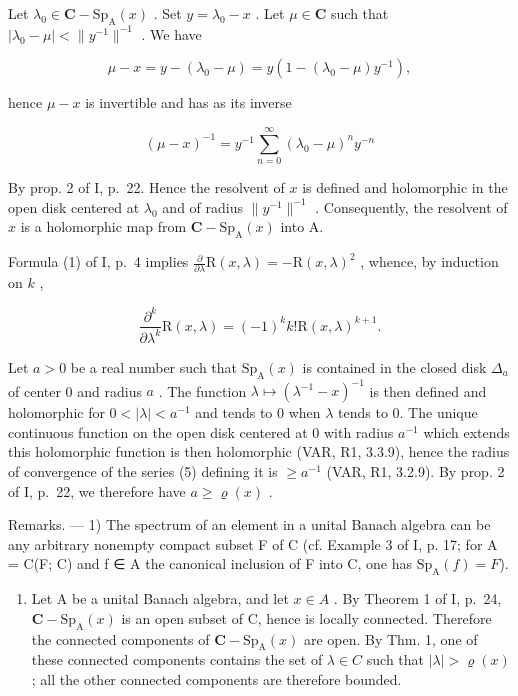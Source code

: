 Let \(\lambda_0\in \mathbf{C} - \mathrm{Sp}_{\mathrm{A}}(x)\) . Set \(y = \lambda_0 - x\) . Let \(\mu \in \mathbf{C}\) such that \(|\lambda_0 - \mu | < \| y^{-1}\|^{-1}\) . We have

\[
\mu - x = y - (\lambda_ {0} - \mu) = y (1 - (\lambda_ {0} - \mu) y ^ {- 1}),
\]

hence \(\mu - x\) is invertible and has as its inverse

\[
(\mu - x) ^ {- 1} = y ^ {- 1} \sum_ {n = 0} ^ {\infty} (\lambda_ {0} - \mu) ^ {n} y ^ {- n}\tag{6}
\]

By prop. 2 of I, p.~22. Hence the resolvent of \(x\) is defined and holomorphic in the open disk centered at \(\lambda_0\) and of radius \(\| y^{-1} \|^{-1}\) . Consequently, the resolvent of \(x\) is a holomorphic map from \(\mathbf{C} - \mathrm{Sp}_{\mathrm{A}}(x)\) into A.

Formula (1) of I, p.~4 implies \(\frac{\partial}{\partial\lambda}\mathrm{R}(x,\lambda) = -\mathrm{R}(x,\lambda)^2\) , whence, by induction on \(k\) ,

\[
\frac {\partial^ {k}}{\partial \lambda^ {k}} \mathrm{R} (x, \lambda) = (- 1) ^ {k} k! \mathrm{R} (x, \lambda) ^ {k + 1}.
\]

Let \(a > 0\) be a real number such that \(\mathrm{Sp}_{\mathrm{A}}(x)\) is contained in the closed disk \(\Delta_{a}\) of center 0 and radius \(a\) . The function \(\lambda \mapsto (\lambda^{-1} - x)^{-1}\) is then defined and holomorphic for \(0 < |\lambda| < a^{-1}\) and tends to 0 when \(\lambda\) tends to 0. The unique continuous function on the open disk centered at 0 with radius \(a^{-1}\) which extends this holomorphic function is then holomorphic (VAR, R1, 3.3.9), hence the radius of convergence of the series (5) defining it is \(\geqslant a^{-1}\) (VAR, R1, 3.2.9). By prop. 2 of I, p.~22, we therefore have \(a \geqslant \varrho(x)\) .

Remarks. --- 1) The spectrum of an element in a unital Banach algebra can be any arbitrary nonempty compact subset F of C (cf. Example 3 of I, p. 17; for A = C(F; C) and f ∈ A the canonical inclusion of F into C, one has \(\mathrm{Sp}_{\mathrm{A}}(f) = F\)).

\begin{enumerate}
\def\labelenumi{\arabic{enumi})}
\setcounter{enumi}{1}
\tightlist
\item
  Let A be a unital Banach algebra, and let \(x \in A\) . By Theorem 1 of I, p.~24, \(\mathbf{C} - \mathrm{Sp}_{\mathrm{A}}(x)\) is an open subset of C, hence is locally connected. Therefore the connected components of \(\mathbf{C} - \mathrm{Sp}_{\mathrm{A}}(x)\) are open. By Thm. 1, one of these connected components contains the set of \(\lambda \in C\) such that \(|\lambda| > \varrho(x)\) ; all the other connected components are therefore bounded.
\end{enumerate}

